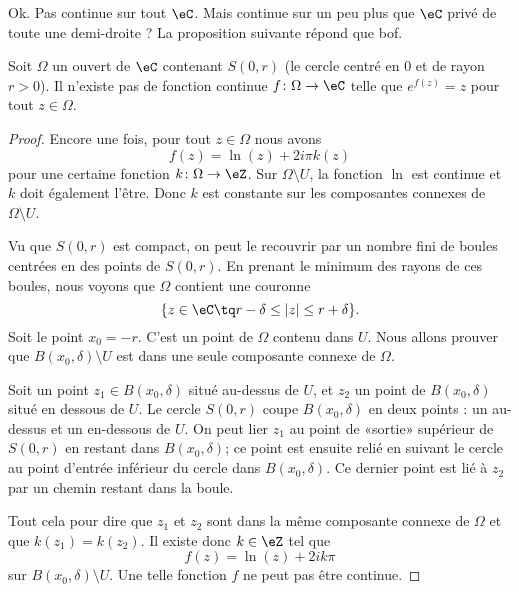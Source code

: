 Ok. Pas continue sur tout \( \eC\). Mais continue sur un peu plus que \( \eC\) privé de toute une demi-droite ? La proposition suivante répond que bof.

\begin{proposition}
    Soit \( \Omega\) un ouvert de \( \eC\) contenant \( S(0,r)\) (le cercle centré en \( 0\) et de rayon \( r>0\)). Il n'existe pas de fonction continue \( f\colon \Omega\to \eC\) telle que \(  e^{f(z)}=z\) pour tout \( z\in \Omega\).
\end{proposition}

\begin{proof}
    Encore une fois, pour tout \( z\in \Omega\) nous avons
    \begin{equation}
        f(z)=\ln(z)+2i\pi k(z)
    \end{equation}
    pour une certaine fonction \( k\colon \Omega\to \eZ\). Sur \( \Omega\setminus U\), la fonction \( \ln\) est continue et \( k\) doit également l'être. Donc \( k\) est constante sur les composantes connexes de \( \Omega\setminus U\).

    Vu que \( S(0,r)\) est compact, on peut le recouvrir par un nombre fini de boules centrées en des points de \( S(0,r)\). En prenant le minimum des rayons de ces boules, nous voyons que \( \Omega\) contient une couronne
    \begin{equation}
        \{ z\in \eC\tq r-\delta\leq | z |\leq r+\delta \}.
    \end{equation}
    Soit le point \( x_0=-r\). C'est un point de \( \Omega\) contenu dans \( U\). Nous allons prouver que \( B(x_0,\delta)\setminus U\) est dans une seule composante connexe de \( \Omega\).

    Soit un point \( z_1\in B(x_0,\delta)\) situé au-dessus de \( U\), et \( z_2\) un point de \( B(x_0,\delta)\) situé en dessous de \( U\). Le cercle \( S(0,r)\) coupe \( B(x_0,\delta)\) en deux points : un au-dessus et un en-dessous de \( U\). On peut lier \( z_1\) au point de «sortie» supérieur de \( S(0,r)\) en restant dans \( B(x_0,\delta)\); ce point est ensuite relié en suivant le cercle au point d'entrée inférieur du cercle dans \( B(x_0,\delta)\). Ce dernier point est lié à \( z_2\) par un chemin restant dans la boule.

    Tout cela pour dire que \( z_1\) et \( z_2\) sont dans la même composante connexe de \( \Omega\) et que \( k(z_1)=k(z_2)\). Il existe donc \( k\in \eZ\) tel que
    \begin{equation}
        f(z)=\ln(z)+2ik\pi
    \end{equation}
    sur \( B(x_0,\delta)\setminus U\). Une telle fonction \( f\) ne peut pas être continue.
\end{proof}

